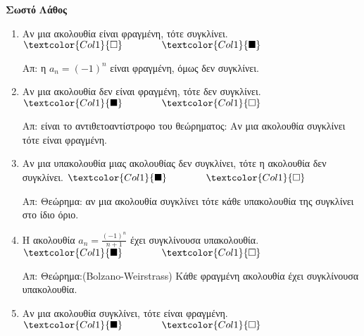 



\pagestyle{askhseis}




\begin{center}
  \minibox{\large\bfseries \textcolor{Col2}{Ακολουθίες (Ερωτήσεις)}}
\end{center}


\vspace{\baselineskip}

\hfill \textcolor{Col1}{\textbf{Σωστό}} \quad \textcolor{Col1}{\textbf{Λάθος}}
\begin{enumerate}[itemsep=.5\baselineskip]
  \item \textcolor{Col1}{Αν μια ακολουθία είναι φραγμένη, τότε συγκλίνει}. 
    \hfill $\textcolor{Col1}{\square} \qquad \qquad \textcolor{Col1}{\blacksquare}$

    Απ: η $ a_{n}=(-1)^{n} $ είναι φραγμένη, όμως δεν συγκλίνει. 

  \item \textcolor{Col1}{Αν μια ακολουθία δεν είναι φραγμένη, τότε δεν συγκλίνει}.
    \hfill $\textcolor{Col1}{\blacksquare} \qquad \qquad \textcolor{Col1}{\square}$

    Απ: είναι το αντιθετοαντίστροφο του θεώρηματος: Αν μια ακολουθία συγκλίνει τότε 
    είναι φραγμένη. 

  \item \textcolor{Col1}{Αν μια υπακολουθία μιας ακολουθίας δεν συγκλίνει, τότε η
    ακολουθία δεν συγκλίνει}.
    \hfill $\textcolor{Col1}{\blacksquare} \qquad \qquad \textcolor{Col1}{\square}$

    Απ: Θεώρημα: αν μια ακολουθία συγκλίνει τότε κάθε υπακολουθία της συγκλίνει 
    στο ίδιο όριο. 

  \item \textcolor{Col1}{Η ακολουθία $ a_{n}= \frac{(-1)^{n}}{n+1} $ έχει συγκλίνουσα
    υπακολουθία}.
    \hfill $\textcolor{Col1}{\blacksquare} \qquad \qquad \textcolor{Col1}{\square}$

    Απ: Θεώρημα:(Bolzano-Weirstrass) Κάθε φραγμένη ακολουθία έχει συγκλίνουσα 
    υπακολουθία. 

  \item \textcolor{Col1}{Αν μια ακολουθία συγκλίνει, τότε είναι φραγμένη}.
    \hfill $\textcolor{Col1}{\blacksquare} \qquad \qquad \textcolor{Col1}{\square}$


\end{enumerate}
